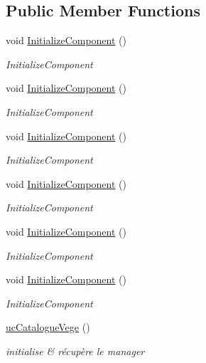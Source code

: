 \subsection*{Public Member Functions}
\begin{DoxyCompactItemize}
\item 
void \hyperlink{classnewPizza1_1_1ucCatalogueVege_afc2e8f9dfd99c8252e745a8636e230da}{Initialize\+Component} ()
\begin{DoxyCompactList}\small\item\em Initialize\+Component \end{DoxyCompactList}\item 
void \hyperlink{classnewPizza1_1_1ucCatalogueVege_afc2e8f9dfd99c8252e745a8636e230da}{Initialize\+Component} ()
\begin{DoxyCompactList}\small\item\em Initialize\+Component \end{DoxyCompactList}\item 
void \hyperlink{classnewPizza1_1_1ucCatalogueVege_afc2e8f9dfd99c8252e745a8636e230da}{Initialize\+Component} ()
\begin{DoxyCompactList}\small\item\em Initialize\+Component \end{DoxyCompactList}\item 
void \hyperlink{classnewPizza1_1_1ucCatalogueVege_afc2e8f9dfd99c8252e745a8636e230da}{Initialize\+Component} ()
\begin{DoxyCompactList}\small\item\em Initialize\+Component \end{DoxyCompactList}\item 
void \hyperlink{classnewPizza1_1_1ucCatalogueVege_afc2e8f9dfd99c8252e745a8636e230da}{Initialize\+Component} ()
\begin{DoxyCompactList}\small\item\em Initialize\+Component \end{DoxyCompactList}\item 
void \hyperlink{classnewPizza1_1_1ucCatalogueVege_afc2e8f9dfd99c8252e745a8636e230da}{Initialize\+Component} ()
\begin{DoxyCompactList}\small\item\em Initialize\+Component \end{DoxyCompactList}\item 
\hyperlink{classnewPizza1_1_1ucCatalogueVege_af106052e8c25e90b258c03b84cd71e33}{uc\+Catalogue\+Vege} ()
\begin{DoxyCompactList}\small\item\em initialise \& récupère le manager \end{DoxyCompactList}\end{DoxyCompactItemize}
